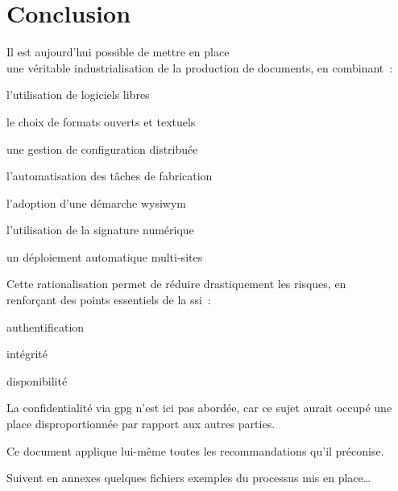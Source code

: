 \section{Conclusion}

Il est aujourd’hui possible de mettre en place\\
une véritable industrialisation de la production de documents, en combinant :
\begin{itmz}
\item{l’utilisation de logiciels libres}
\item{le choix de formats ouverts et textuels}
\item{une gestion de configuration distribuée}
\item{l’automatisation des tâches de fabrication}
\item{l’adoption d’une démarche \gls{wysiwym}}
\item{l’utilisation de la signature numérique}
\item{un déploiement automatique multi-sites}
\end{itmz}

Cette rationalisation permet de réduire drastiquement les risques, en\\
renforçant des points essentiels de la \gls{ssi} :
\begin{itmz}
\item{authentification}
\item{intégrité}
\item{disponibilité}
\end{itmz}
La confidentialité via \gls{gpg} \cite{gpg} n’est ici pas abordée, car ce sujet
aurait occupé une place disproportionnée par rapport aux autres parties.

\hr

Ce document applique lui-même toutes les recommandations qu’il préconise.

Suivent en annexes quelques fichiers exemples du processus mis en place…

\pagebreak

